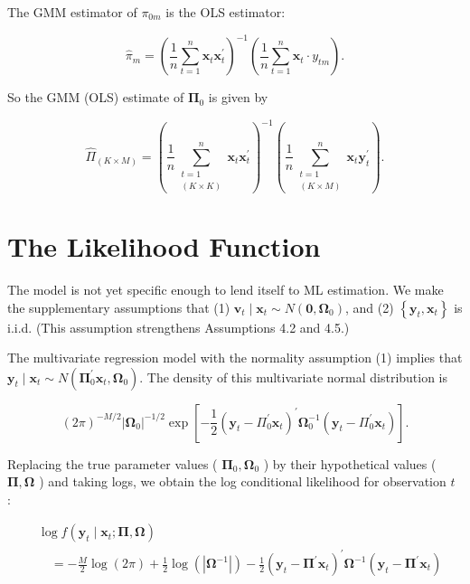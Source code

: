 \documentclass[10pt]{article}
\begin{document}
The GMM estimator of $\pi_{0 m}$ is the OLS estimator:


\begin{equation*}
\widehat{\pi}_{m}=\left(\frac{1}{n} \sum_{t=1}^{n} \mathbf{x}_{t} \mathbf{x}_{t}^{\prime}\right)^{-1}\left(\frac{1}{n} \sum_{t=1}^{n} \mathbf{x}_{t} \cdot y_{t m}\right) . \tag{8.4.4}
\end{equation*}


So the GMM (OLS) estimate of $\mathbf{\Pi}_{0}$ is given by


\begin{equation*}
\widehat{\Pi}_{(K \times M)}=\left(\frac{1}{n} \sum_{\substack{t=1 \\(K \times K)}}^{n} \mathbf{x}_{t} \mathbf{x}_{t}^{\prime}\right)^{-1}\left(\frac{1}{n} \sum_{\substack{t=1 \\(K \times M)}}^{n} \mathbf{x}_{t} \mathbf{y}_{t}^{\prime}\right) . \tag{8.4.5}
\end{equation*}


\section*{The Likelihood Function}
The model is not yet specific enough to lend itself to ML estimation. We make the supplementary assumptions that (1) $\mathbf{v}_{t} \mid \mathbf{x}_{t} \sim N\left(\mathbf{0}, \boldsymbol{\Omega}_{0}\right)$, and (2) $\left\{\mathbf{y}_{t}, \mathbf{x}_{t}\right\}$ is i.i.d. (This assumption strengthens Assumptions 4.2 and 4.5.)

The multivariate regression model with the normality assumption (1) implies that $\mathbf{y}_{t} \mid \mathbf{x}_{t} \sim N\left(\boldsymbol{\Pi}_{0}^{\prime} \mathbf{x}_{t}, \boldsymbol{\Omega}_{0}\right)$. The density of this multivariate normal distribution is


\begin{equation*}
(2 \pi)^{-M / 2}\left|\mathbf{\Omega}_{0}\right|^{-1 / 2} \exp \left[-\frac{1}{2}\left(\mathbf{y}_{t}-\Pi_{0}^{\prime} \mathbf{x}_{t}\right)^{\prime} \mathbf{\Omega}_{0}^{-1}\left(\mathbf{y}_{t}-\Pi_{0}^{\prime} \mathbf{x}_{t}\right)\right] . \tag{8.4.6}
\end{equation*}


Replacing the true parameter values ( $\boldsymbol{\Pi}_{0}, \boldsymbol{\Omega}_{0}$ ) by their hypothetical values ( $\boldsymbol{\Pi}, \boldsymbol{\Omega}$ ) and taking logs, we obtain the log conditional likelihood for observation $t$ :


\begin{align*}
& \log f\left(\mathbf{y}_{t} \mid \mathbf{x}_{t} ; \boldsymbol{\Pi}, \boldsymbol{\Omega}\right) \\
& \quad=-\frac{M}{2} \log (2 \pi)+\frac{1}{2} \log \left(\left|\boldsymbol{\Omega}^{-1}\right|\right)-\frac{1}{2}\left(\mathbf{y}_{t}-\boldsymbol{\Pi}^{\prime} \mathbf{x}_{t}\right)^{\prime} \boldsymbol{\Omega}^{-1}\left(\mathbf{y}_{t}-\boldsymbol{\Pi}^{\prime} \mathbf{x}_{t}\right) \tag{8.4.7}
\end{align*}
\end{document}
